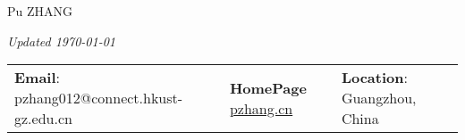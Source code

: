 \documentclass[letterpaper, 11pt]{article}
\begin{document}
\begin{center}
    \Huge Pu ZHANG
\end{center}
\hfill{\it\footnotesize Updated \today}


\vspace{0cm} 
\begin{center}
\begin{tabular}{lll}
\textbf{Email}: pzhang012@connect.hkust-gz.edu.cn     &
\hspace{0.1in} \textbf{HomePage} \href{https://pzhang.cn}{pzhang.cn}    &

\hspace{0.1in} \textbf{Location}: Guangzhou, China 
\end{tabular}
\end{center}


\setlength{\tabcolsep}{8pt}
\end{document}
